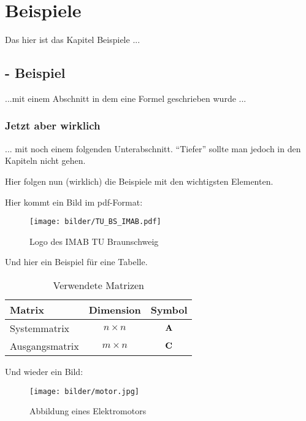 \chapter{Beispiele}
\label{beispiele}

Das hier ist das Kapitel Beispiele ...

\section[$e^{x}$ - Beispiel]{ - Beispiel}
\label{e_hoch_x_beispiel}

...mit einem Abschnitt in dem eine Formel geschrieben wurde ...

\subsection{Jetzt aber wirklich}
\label{jetzt_aber_wirklich}

... mit noch einem folgenden Unterabschnitt. "`Tiefer"' sollte man jedoch in den Kapiteln nicht gehen.\newline

Hier folgen nun (wirklich) die Beispiele mit den wichtigsten Elementen.

Hier kommt ein Bild im pdf-Format:
\begin{figure}[ht]
 \begin{center}
  \texttt{[image: bilder/TU\_BS\_IMAB.pdf]}
  \caption{Logo des IMAB TU Braunschweig}
  \label{fig:logo_IMAB}
 \end{center}
\end{figure}

Und hier ein Beispiel für eine Tabelle.
\begin{table}[ht]
 \begin{center}
 \caption{Verwendete Matrizen}
 \label{tab:matrizen}
  \begin{tabular}{|l|c|c|}
   \hline
   Matrix & Dimension & Symbol \\
   \hline
   Systemmatrix & $n \times n$ & ${\textbf A}$  \\
   \hline
   Ausgangsmatrix & $m \times n$ & ${\textbf C}$  \\
   \hline
  \end{tabular}
 \end{center}
\end{table}

Und wieder ein Bild:
\begin{figure}[ht]
	\centering
	 \texttt{[image: bilder/motor.jpg]}
	\caption{Abbildung eines Elektromotors}
	\label{fig:motor}
\end{figure}


